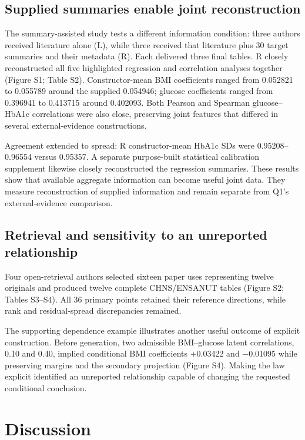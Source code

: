 \documentclass[sigconf,anonymous,review]{acmart}
\begin{document}
\subsection{Supplied summaries enable joint reconstruction}

The summary-assisted study tests a different information condition: three authors received literature alone (L), while three received that literature plus 30 target summaries and their metadata (R). Each delivered three final tables. R closely reconstructed all five highlighted regression and correlation analyses together (Figure S1; Table S2). Constructor-mean BMI coefficients ranged from 0.052821 to 0.055789 around the supplied 0.054946; glucose coefficients ranged from 0.396941 to 0.413715 around 0.402093. Both Pearson and Spearman glucose–\allowbreak{}HbA1c correlations were also close, preserving joint features that differed in several external-evidence constructions.


Agreement extended to spread: R constructor-mean HbA1c SDs were 0.95208–\allowbreak{}0.96554 versus 0.95357. A separate purpose-built statistical calibration supplement likewise closely reconstructed the regression summaries. These results show that available aggregate information can become useful joint data. They measure reconstruction of supplied information and remain separate from Q1's external-evidence comparison.


\subsection{Retrieval and sensitivity to an unreported relationship}

Four open-retrieval authors selected sixteen paper uses representing twelve originals and produced twelve complete CHNS/\allowbreak{}ENSANUT tables (Figure S2; Tables S3–\allowbreak{}S4). All 36 primary points retained their reference directions, while rank and residual-spread discrepancies remained.


The supporting dependence example illustrates another useful outcome of explicit construction. Before generation, two admissible BMI–\allowbreak{}glucose latent correlations, 0.10 and 0.40, implied conditional BMI coefficients +0.03422 and −0.01095 while preserving margins and the secondary projection (Figure S4). Making the law explicit identified an unreported relationship capable of changing the requested conditional conclusion.


\section{Discussion}
\end{document}
